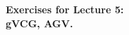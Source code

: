 \documentclass[a4paper]{article}
\newif\ifsolutions
\begin{document}
\begin{center}
		\LARGE\textbf{Exercises for Lecture 5:\\ gVCG, AGV.}
\end{center}


%
%
%
%
\end{document}
